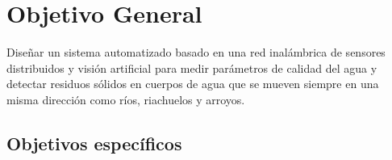 \section{Objetivo General}
Diseñar un sistema automatizado basado en una red inalámbrica de sensores distribuidos y visión artificial para medir parámetros de calidad del agua y detectar residuos sólidos en cuerpos de agua que se mueven siempre en una misma dirección como ríos, riachuelos y arroyos. 


\subsection{Objetivos específicos}
